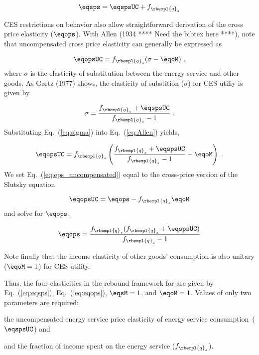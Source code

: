 \begin{equation} \label{eq:eqsps}
  \eqsps = \eqspsUC + f_{\rbempl{q}_s}
\end{equation}

CES restrictions on behavior also allow straightforward derivation of the cross price elasticity ($\eqops$).
With Allen (1934 **** Need the bibtex here ****), 
note that uncompensated cross price elasticity can generally be expressed as

\begin{equation} \label{eq:Allen}
  \eqopsUC = f_{\rbempl{q}_s} (\sigma - \eqoM) \; ,
\end{equation}
%
where $\sigma$ is the elasticity of substitution 
between the energy service and other goods.
As G{\o}rtz (1977) shows, the elasticity 
of substition ($\sigma$) for CES utiliy is given by

\begin{equation} \label{eq:sigma}
  \sigma  = \frac{f_{\rbempl{q}_s} + \eqspsUC}{f_{\rbempl{q}_s} -1 } \; .
\end{equation}
%
Substituting Eq.~(\ref{eq:sigma}) into Eq.~(\ref{eq:Allen}) yields, 

\begin{equation} \label{eq:eps_uncompensated}
  \eqopsUC = f_{\rbempl{q}_s} \left( \frac{f_{\rbempl{q}_s} + \eqspsUC}{f_{\rbempl{q}_s} -1 } - \eqoM \right) \; .
\end{equation}
%
We set Eq.~(\ref{eq:eps_uncompensated}) equal to 
the cross-price version of the Slutsky equation

\begin{equation}
  \eqopsUC = \eqops - f_{\rbempl{q}_s} \eqoM
\end{equation}
%
and solve for $\eqops$.

\begin{equation} \label{eq:eqops}
  \eqops = \frac{f_{\rbempl{q}_s} (f_{\rbempl{q}_s} + \eqspsUC)}{f_{\rbempl{q}_s}-1}
\end{equation}

Note finally that the income elasticity of other goods' consumption
is also unitary ($\eqoM = 1$) for CES utility. 

Thus, the four elasticities in the rebound framework for are given by
Eq.~(\ref{eq:eqsps}), 
Eq.~(\ref{eq:eqops}), 
$\eqsM = 1$, and 
$\eqoM = 1$.
Values of only two parameters are required:
%
\begin{enumerate*}[label={(\alph*)}]
	
  \item the uncompensated energy service price elasticity of energy service consumption~($\eqspsUC$) and
  
  \item and the fraction of income spent on the energy service ($f_{\rbempl{q}_s}$).
    
\end{enumerate*}

